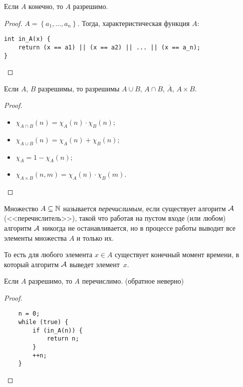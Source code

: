 \begin{proposition}
    Если $A$ конечно, то $A$ разрешимо.
\end{proposition}

\begin{proof}
    $A = \left\{a_1, \dots, a_n\right\}$.
    Тогда, характеристическая функция $A$:
    \begin{lstlisting}
int in_A(x) {
    return (x == a1) || (x == a2) || ... || (x == a_n);
}
    \end{lstlisting}
\end{proof}

\begin{proposition}
    Если $A$, $B$ разрешимы, то разрешимы $A \cup B$, $A \cap B$, $\overline{A}$, $A \times B$.
\end{proposition}

\begin{proof}~
    \begin{itemize}
    \item $\chi_{A \cap B}(n) = \chi_A(n) \cdot \chi_B(n)$;
    \item $\chi_{A \cup B}(n) = \chi_A(n) + \chi_B(n)$;
    \item $\chi_{\overline{A}} = 1 - \chi_A(n)$;
    \item $\chi_{A \times B}(n, m) = \chi_A(n) \cdot \chi_B(m)$.
        \qedhere
    \end{itemize}   
\end{proof}

\begin{definition}
    Множество $A \subseteq \mathbb{N}$ называется \textit{перечислимым}, если существует алгоритм $\mathcal{A}$ (<<перечислитель>>), такой что работая на пустом входе (или любом) алгоритм $\mathcal{A}$ никогда не останавливается, но в процессе работы выводит все элементы множества $A$ и только их.
\end{definition}

То есть для любого элемента $x \in A$ существует конечный момент времени, в который алгоритм $\mathcal{A}$ выведет элемент~$x$.

\begin{proposition}
    Если $A$ разрешимо, то $A$ перечислимо. (обратное неверно)
\end{proposition}

\begin{proof}~
    \begin{lstlisting}
    n = 0;
    while (true) {
        if (in_A(n)) {
            return n;
        }
        ++n;
    }
    \end{lstlisting}
\end{proof}

